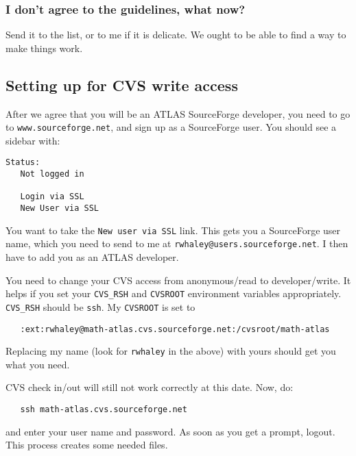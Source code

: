 \documentclass[11pt]{article}
\begin{document}
{\subsubsection{I don't agree to the guidelines, what now?}
Send it to the list, or to me if it is delicate.  We ought to be able
to find a way to make things work.


\subsection{Setting up for CVS write access}
After we agree that you will be an ATLAS SourceForge developer, you need
to go to {\tt www.sourceforge.net}, and sign up as a SourceForge user.
You should see a sidebar with:
\begin{verbatim}
Status:
   Not logged in

   Login via SSL
   New User via SSL
\end{verbatim}

You want to take the {\tt New user via SSL} link.
This gets you a SourceForge user name, which you need to send to me at
{\tt rwhaley@users.sourceforge.net}.  I then have to add you as an ATLAS
developer.

You need to change your CVS access from anonymous/read to developer/write.
It helps if you set your {\tt CVS\_RSH} and {\tt CVSROOT} environment variables
appropriately.  {\tt CVS\_RSH} should be {\tt ssh}.  My {\tt CVSROOT} is
set to 
\begin{verbatim}
   :ext:rwhaley@math-atlas.cvs.sourceforge.net:/cvsroot/math-atlas
\end{verbatim}
Replacing my name (look for {\tt rwhaley} in the above) with yours should
get you what you need.

CVS check in/out will still not work correctly at this date.  Now, do:

\begin{verbatim}
   ssh math-atlas.cvs.sourceforge.net
\end{verbatim}
and enter your user name and
password.  As soon as you get a prompt, logout.  This process creates some 
needed files.

}
\end{document}
